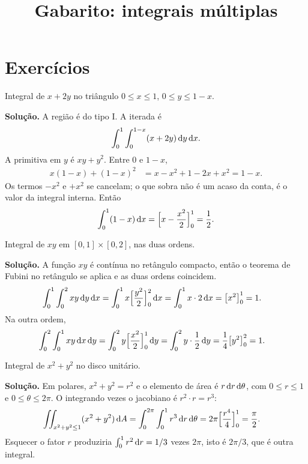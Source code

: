 \documentclass[11pt,a4paper]{article}
\title{Gabarito: integrais múltiplas}
\author{}
\date{}
\begin{document}
\maketitle
\tableofcontents

\section{Exercícios}

\begin{exercicio}
Integral de $x+2y$ no triângulo $0\le x\le 1$, $0\le y\le 1-x$.

\textbf{Solução.}
A região é do tipo I. A iterada é
\[
\int_0^1\int_0^{1-x}(x+2y)\,\mathrm{d} y\,\mathrm{d} x.
\]
A primitiva em $y$ é $xy+y^2$. Entre $0$ e $1-x$,
\begin{align*}
x(1-x)+(1-x)^2
&=x-x^2+1-2x+x^2
=1-x.
\end{align*}
Os termos $-x^2$ e $+x^2$ se cancelam; o que sobra não é um acaso da conta, é o valor da integral interna. Então
\[
\int_0^1(1-x)\,\mathrm{d} x=\Bigl[x-\frac{x^2}{2}\Bigr]_0^1=\frac12.
\]
\end{exercicio}

\begin{exercicio}
Integral de $xy$ em $[0,1]\times[0,2]$, nas duas ordens.

\textbf{Solução.}
A função $xy$ é contínua no retângulo compacto, então o teorema de Fubini no retângulo se aplica e as duas ordens coincidem.
\begin{align*}
\int_0^1\int_0^2 xy\,\mathrm{d} y\,\mathrm{d} x
&=\int_0^1 x\Bigl[\frac{y^2}{2}\Bigr]_0^2\,\mathrm{d} x
=\int_0^1 x\cdot 2\,\mathrm{d} x
=\bigl[x^2\bigr]_0^1
=1.
\end{align*}
Na outra ordem,
\begin{align*}
\int_0^2\int_0^1 xy\,\mathrm{d} x\,\mathrm{d} y
&=\int_0^2 y\Bigl[\frac{x^2}{2}\Bigr]_0^1\,\mathrm{d} y
=\int_0^2 y\cdot\frac12\,\mathrm{d} y
=\frac14\bigl[y^2\bigr]_0^2
=1.
\end{align*}
\end{exercicio}

\begin{exercicio}
Integral de $x^2+y^2$ no disco unitário.

\textbf{Solução.}
Em polares, $x^2+y^2=r^2$ e o elemento de área é $r\,\mathrm{d} r\,\mathrm{d}\theta$, com $0\le r\le 1$ e $0\le\theta\le 2\pi$. O integrando vezes o jacobiano é $r^2\cdot r=r^3$:
\begin{align*}
\iint_{x^2+y^2\le 1}(x^2+y^2)\,\mathrm{d} A
&=\int_0^{2\pi}\int_0^1 r^3\,\mathrm{d} r\,\mathrm{d}\theta
=2\pi\Bigl[\frac{r^4}{4}\Bigr]_0^1
=\frac{\pi}{2}.
\end{align*}
Esquecer o fator $r$ produziria $\int_0^1 r^2\,\mathrm{d} r=1/3$ vezes $2\pi$, isto é $2\pi/3$, que é outra integral.
\end{exercicio}
\end{document}
